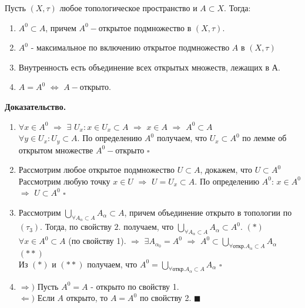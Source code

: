 \begin{theorem} 
Пусть $(X,\tau)$ любое топологическое пространство и $A{\subset}X$. Тогда:
    \begin{enumerate}
    \item $A^0\subset A$, причем $A^0-$открытое подмножество в $(X,\tau)$.
    \item $A^0$ - максимальное по включению открытое подмножество $A$ в $(X,\tau)$
    \item Внутренность есть объединение всех открытых множеств, лежащих в А.
    \item $A=A^0$ $\Leftrightarrow$ $A-$открыто.
    \end{enumerate}

\textbf{Доказательство.}\\  
\begin{enumerate}
    \item $\forall x{\in}A^0$ $\Rightarrow$ $\exists$ $U_x: x{\in}U_x{\subset}A$ $\Rightarrow$ $x{\in}A$ $\Rightarrow$ $A^0{\subset}A$\\
    $\forall y{\in}U_x: U_y{\subset}A$. По определению $A^0$ получаем, что $U_x{\subset}A^0$ по лемме об открытом множестве $A^0-$открыто $\square$
    \item Рассмотрим любое открытое подмножество $U{\subset}A$, докажем, что $U{\subset}A^0$\\
    Рассмотрим любую точку $x{\in}U$ $\Rightarrow$ $U=U_x{\subset}A$. По определению $A^0$: $x{\in}A^0$ $\Rightarrow$ $U{\subset}A^0$ $\square$
    \item Рассмотрим $\bigcup\limits_{\forall A_{\alpha}{\subset}A} A_{\alpha}{\subset}A$, причем объединение открыто в топологии по $(\tau_3)$. Тогда, по свойству $2.$ получаем, что $\bigcup\limits_{\forall A_{\alpha}{\subset}A} A_{\alpha}{\subset}A^0$. $(*)$\\
    $\forall x{\in}A^0{\subset}A$ (по свойству 1). $\Rightarrow$ $\exists A_{\alpha_0}=A^0$ $\Rightarrow$ $A^0{\subset}\bigcup\limits_{\forall\text{откр.}A_{\alpha}{\subset}A} A_{\alpha}$ $(**)$\\
    Из $(*)$ и $(**)$ получаем, что $A^0=\bigcup\limits_{\forall\text{откр.}A_{\alpha}{\subset}A} A_{\alpha}$ $\square$
    \item $\Rightarrow)$ Пусть $A^0=A$ - открыто по свойству 1.\\
    $\Leftarrow)$ Если $A$ открыто, то $A=A^0$ по свойству 2. $\blacksquare$
\end{enumerate}
\end{theorem}
